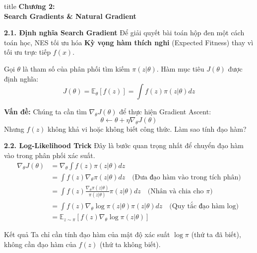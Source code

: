 \documentclass[10pt,xcolor=dvipsnames]{beamer}
\newcommand{\E}{\mathbb{E}}
\begin{document}
\begin{frame}
	\centering
	\begin{beamercolorbox}[sep=16pt,center,shadow=true,rounded=true]{title}
		\huge \textbf{Chương 2:\\[0.5em] Search Gradients \& Natural Gradient} \par
	\end{beamercolorbox}
\end{frame}

\begin{frame}{\textbf{2.1. Định nghĩa Search Gradient}}
	Để giải quyết bài toán hộp đen một cách toán học, NES tối ưu hóa \textbf{Kỳ vọng hàm thích nghi} (Expected Fitness) thay vì tối ưu trực tiếp $f(x)$.
	
	Gọi $\theta$ là tham số của phân phối tìm kiếm $\pi(z|\theta)$. Hàm mục tiêu $J(\theta)$ được định nghĩa:
	\begin{equation}
		J(\theta) = \E_{\theta}[f(z)] = \int f(z) \pi(z|\theta) dz
	\end{equation}
	
	\textbf{Vấn đề:} Chúng ta cần tìm $\nabla_\theta J(\theta)$ để thực hiện Gradient Ascent:
	\[ \theta \leftarrow \theta + \eta \nabla_\theta J(\theta) \]
	Nhưng $f(z)$ không khả vi hoặc không biết công thức. Làm sao tính đạo hàm?
\end{frame}

\begin{frame}{\textbf{2.2. Log-Likelihood Trick}}
	Đây là bước quan trọng nhất để chuyển đạo hàm vào trong phân phối xác suất.
	\begin{align}
		\nabla_\theta J(\theta) &= \nabla_\theta \int f(z) \pi(z|\theta) dz \nonumber \\
		&= \int f(z) \nabla_\theta \pi(z|\theta) dz \quad \text{(Đưa đạo hàm vào trong tích phân)} \nonumber \\
		&= \int f(z) \frac{\nabla_\theta \pi(z|\theta)}{\pi(z|\theta)} \pi(z|\theta) dz \quad \text{(Nhân và chia cho } \pi) \nonumber \\
		&= \int f(z) \nabla_\theta \log \pi(z|\theta) \pi(z|\theta) dz \quad \text{(Quy tắc đạo hàm log)} \nonumber \\
		&= \E_{z \sim \pi} \left[ f(z) \nabla_\theta \log \pi(z|\theta) \right]
	\end{align}
	
	\begin{block}{Kết quả}
		Ta chỉ cần tính đạo hàm của mật độ xác suất $\log \pi$ (thứ ta đã biết), không cần đạo hàm của $f(z)$ (thứ ta không biết).
	\end{block}
\end{frame}
\end{document}

